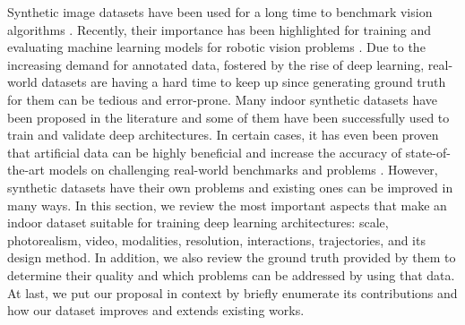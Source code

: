 Synthetic image datasets have been used for a long time to benchmark vision algorithms \cite{Butler2012}. Recently, their importance has been highlighted for training and evaluating machine learning models for robotic vision problems \cite{Brodeur2017, Ros2016, Mahler2017dex}. Due to the increasing demand for annotated data, fostered by the rise of deep learning, real-world datasets are having a hard time to keep up since generating ground truth for them can be tedious and error-prone. Many indoor synthetic datasets have been proposed in the literature and some of them have been successfully used to train and validate deep architectures. In certain cases, it has even been proven that artificial data can be highly beneficial and increase the accuracy of state-of-the-art models on challenging real-world benchmarks and problems \cite{Shrivastava2017,Barbosa2018, Ros2016}. However, synthetic datasets have their own problems and existing ones can be improved in many ways. In this section, we review the most important aspects that make an indoor dataset suitable for training deep learning architectures: scale, photorealism, video, modalities, resolution, interactions, trajectories, and its design method. In addition, we also review the ground truth provided by them to determine their quality and which problems can be addressed by using that data. At last, we put our proposal in context by briefly enumerate its contributions and how our dataset improves and extends existing works.

